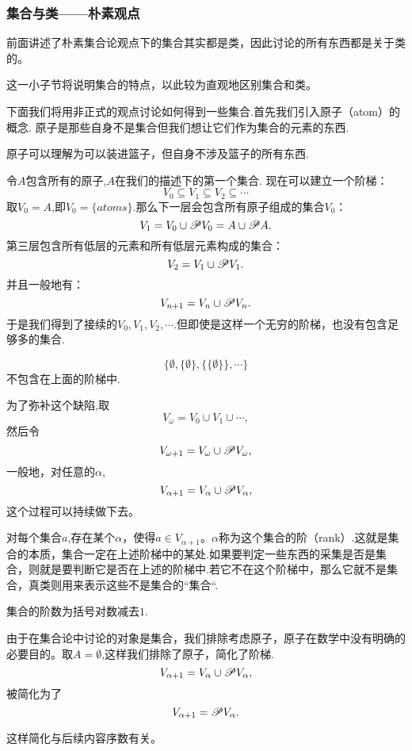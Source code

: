 \subsubsection{集合与类——朴素观点}
前面讲述了朴素集合论观点下的集合其实都是类，因此讨论的所有东西都是关于类的。

这一小子节将说明集合的特点，以此较为直观地区别集合和类。

下面我们将用非正式的观点讨论如何得到一些集合.首先我们引入原子（atom）的概念.
原子是那些自身不是集合但我们想让它们作为集合的元素的东西.

\begin{note}
原子可以理解为可以装进篮子，但自身不涉及篮子的所有东西.
\end{note}
令$A$包含所有的原子,$A$在我们的描述下的第一个集合.
现在可以建立一个阶梯：
\[V_0\subseteq V_1\subseteq V_2\subseteq \cdots\]
取$V_0=A$,即$V_0=\{atoms\}$.那么下一层会包含所有原子组成的集合$V_0$：
\[V_1=V_0\cup\mathscr{P} V_0=A\cup\mathscr{P} A.\]
第三层包含所有低层的元素和所有低层元素构成的集合：
\[V_2=V_1\cup\mathscr{P} V_1.\]
并且一般地有：
\[V_{n+1}=V_n\cup\mathscr{P} V_n.\]
于是我们得到了接续的$V_0,V_1,V_2,\cdots$.但即使是这样一个无穷的阶梯，也没有包含足够多的集合.

\begin{example}
    \[\{\emptyset,\{\emptyset\},\{\{\emptyset\}\},\cdots\}\]不包含在上面的阶梯中.
\end{example}

为了弥补这个缺陷,取
\[V_{\omega}=V_0\cup V_1\cup\cdots,\]
然后令
\[V_{\omega+1}=V_{\omega}\cup\mathscr{P} V_{\omega},\]
一般地，对任意的$\alpha$,
\[V_{\alpha+1}=V_{\alpha}\cup\mathscr{P} V_{\alpha},\]
这个过程可以持续做下去。

对每个集合$a$,存在某个$\alpha$，使得$a\in V_{\alpha+1}$。$\alpha$称为这个集合的阶（rank）.这就是集合的本质，集合一定在上述阶梯中的某处.如果要判定一些东西的采集是否是集合，则就是要判断它是否在上述的阶梯中.若它不在这个阶梯中，那么它就不是集合，真类则用来表示这些不是集合的“集合“.

\begin{note}
 集合的阶数为括号对数减去$1$.
\end{note}

由于在集合论中讨论的对象是集合，我们排除考虑原子，原子在数学中没有明确的必要目的。取$A=\emptyset$,这样我们排除了原子，简化了阶梯.
\[V_{\alpha+1}=V_{\alpha}\cup\mathscr{P} V_{\alpha},\]
被简化为了
\[V_{\alpha+1}=\mathscr{P} V_{\alpha}.\]

\begin{note}
    这样简化与后续内容序数有关。
\end{note}

